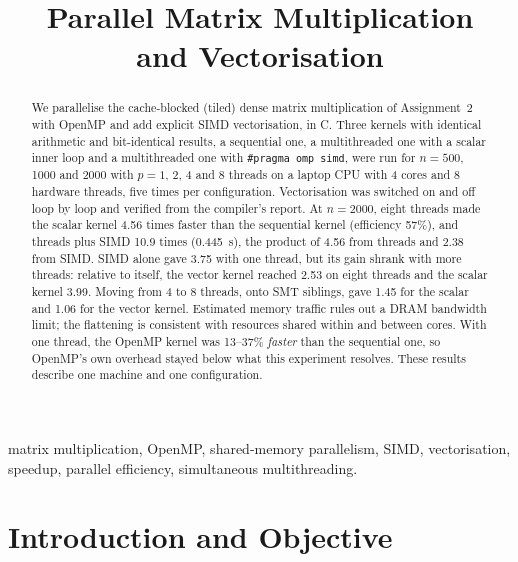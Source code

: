 \documentclass[conference,a4paper]{IEEEtran}
\title{Parallel Matrix Multiplication\\and Vectorisation}
\author{\IEEEauthorblockN{{Javier Ruano Hernández}}
\IEEEauthorblockA{Big Data -- Assignment 3\\
Universidad de Las Palmas de Gran Canaria (ULPGC)\\
Code and data: \url{https://github.com/javierruanohdez/big-data-assignments/tree/main/assignment_3}}}
\newcommand{\code}[1]{\texttt{#1}}
\begin{document}
\maketitle

\begin{abstract}
We parallelise the cache-blocked (tiled) dense matrix multiplication of
Assignment~2 with OpenMP and add explicit SIMD vectorisation, in C. Three
kernels with identical arithmetic and bit-identical results, a sequential one,
a multithreaded one with a scalar inner loop and a multithreaded one with
\code{\#pragma omp simd}, were run for $n = 500$, 1000 and 2000 with $p = 1$,
2, 4 and 8 threads on a laptop CPU with 4 cores and 8 hardware threads, five
times per configuration. Vectorisation was switched on and off loop by loop and
verified from the compiler's report. At $n = 2000$, eight threads made the
scalar kernel 4.56 times faster than the sequential kernel (efficiency 57\%),
and threads plus SIMD 10.9 times (0.445~s), the product of 4.56 from threads
and 2.38 from SIMD. SIMD alone gave 3.75 with one thread, but its gain shrank
with more threads: relative to itself, the vector kernel reached 2.53 on eight
threads and the scalar kernel 3.99. Moving from 4 to 8 threads, onto SMT
siblings, gave 1.45 for the scalar and 1.06 for the vector kernel. Estimated
memory traffic rules out a DRAM bandwidth limit; the flattening is consistent
with resources shared within and between cores. With one thread, the OpenMP kernel
was 13--37\% \emph{faster} than the sequential one, so OpenMP's own overhead
stayed below what this experiment resolves. These results describe one machine
and one configuration.
\end{abstract}

\begin{IEEEkeywords}
matrix multiplication, OpenMP, shared-memory parallelism, SIMD, vectorisation,
speedup, parallel efficiency, simultaneous multithreading.
\end{IEEEkeywords}

\section{Introduction and Objective}
\label{sec:intro}
\end{document}
